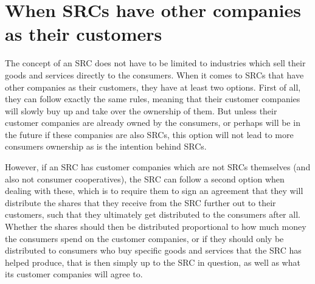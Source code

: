 \documentclass{article}
\begin{document}
\section{When SRCs have other companies as their customers}
\label{sect_B2B}

The concept of an SRC does not have to be limited to industries which sell their goods and services directly to the consumers. When it comes to SRCs that have other companies as their customers, they have at least two options. First of all, they can follow exactly the same rules, meaning that their customer companies will slowly buy up and take over the ownership of them. But unless their customer companies are already owned by the consumers, or perhaps will be in the future if these companies are also SRCs, this option will not lead to more consumers ownership as is the intention behind SRCs. 

However, if an SRC has customer companies which are not SRCs themselves (and also not consumer cooperatives), the SRC can follow a second option when dealing with these, %
which is to require them to sign an agreement that they will distribute the shares that they receive from the SRC further out to their customers, such that they ultimately get distributed to the consumers after all. Whether the shares should then be distributed proportional to how much money the consumers spend on the customer companies, or if they should only be distributed to consumers who buy specific goods and services that the SRC has helped produce, that is then simply up to the SRC in question, %
as well as what its customer companies will agree to.





\end{document}
